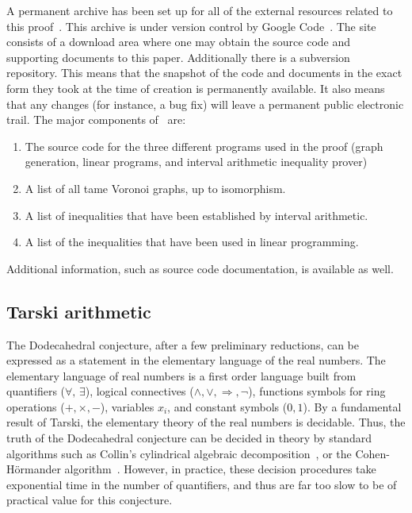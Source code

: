 \documentclass{article} %
\begin{document}
A permanent archive has been set up for all of the external resources
related to this proof~\cite{McLaughlin:2008:KeplerCode}. This archive
is under version control by Google Code~\cite{website:GoogleCode}. The
site consists of a download area where one may obtain the source code
and supporting documents to this paper. Additionally there is a
subversion~\cite{CollinsSussman:2005:Subversion} repository. This
means that the snapshot of the code and documents in the exact form
they took at the time of creation is permanently available. It
also means that any changes (for instance, a bug fix) will leave a
permanent public electronic trail. The major components
of~\cite{McLaughlin:2008:KeplerCode} are:
\begin{enumerate}
\item The source code for the three different programs used in the proof (graph generation, linear programs, and interval arithmetic inequality prover)
\item A list of all tame Voronoi graphs, up to isomorphism.
\item A list of inequalities that have been established by interval arithmetic.
\item  A list of the inequalities that have been used in linear programming.
\end{enumerate}
Additional information, such as source code documentation, is available
as well.

\subsection{Tarski arithmetic}


The Dodecahedral conjecture, after a few preliminary reductions, can
be expressed as a statement in the elementary language of the real
numbers. The elementary language of real numbers is a first order
language built from quantifiers ($\forall,\,\exists$), logical
connectives ($\land,\lor,\Rightarrow,\neg$), functions symbols for
ring operations ($+,\times,-$), variables $x_i$, and constant symbols
($0,1$). By a fundamental result of Tarski, the elementary theory of
the real numbers is decidable. Thus, the truth of the Dodecahedral
conjecture can be decided in theory by standard algorithms such as
Collin's cylindrical algebraic decomposition~\cite{Collins:1975:ATFL},
or the Cohen-H\"ormander algorithm~\cite{Hormander:1983:PDO}. However,
in practice, these decision procedures take exponential time in the
number of quantifiers, and thus are far too slow to be of practical
value for this conjecture.
\end{document}
